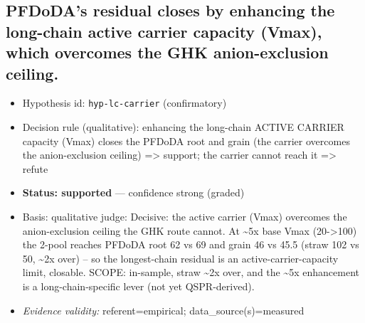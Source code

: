 \documentclass{article}
\begin{document}
\subsection{PFDoDA's residual closes by enhancing the long-chain active carrier capacity (Vmax), which overcomes the GHK anion-exclusion ceiling.}
\begin{itemize}
  \item Hypothesis id: \texttt{hyp-lc-carrier} (confirmatory)
  \item Decision rule (qualitative): enhancing the long-chain ACTIVE CARRIER capacity (Vmax) closes the PFDoDA root and grain (the carrier overcomes the anion-exclusion ceiling) => support; the carrier cannot reach it => refute
  \item \textbf{Status: supported} --- confidence strong (graded)
  \item Basis: qualitative judge: Decisive: the active carrier (Vmax) overcomes the anion-exclusion ceiling the GHK route cannot. At \textasciitilde{}5x base Vmax (20->100) the 2-pool reaches PFDoDA root 62 vs 69 and grain 46 vs 45.5 (straw 102 vs 50, \textasciitilde{}2x over) -- so the longest-chain residual is an active-carrier-capacity limit, closable. SCOPE: in-sample, straw \textasciitilde{}2x over, and the \textasciitilde{}5x enhancement is a long-chain-specific lever (not yet QSPR-derived).
  \item \textit{Evidence validity:} referent=empirical; data\_source(s)=measured
\end{itemize}
\end{document}
